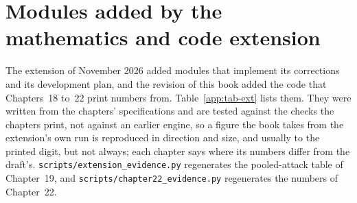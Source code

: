 \section{Modules added by the mathematics and code extension}

The extension of November 2026 added modules that implement its corrections and its development plan, and the
revision of this book added the code that Chapters~18 to~22 print numbers from. Table~\ref{app:tab-ext} lists them.
They were written from the chapters' specifications and are tested against the checks the chapters print, not against
an earlier engine, so a figure the book takes from the extension's own run is reproduced in direction and size, and
usually to the printed digit, but not always; each chapter says where its numbers differ from the draft's.
\texttt{scripts/\allowbreak{}extension\_\allowbreak{}evidence.\allowbreak{}py} regenerates the pooled-attack table of Chapter~19, and
\texttt{scripts/\allowbreak{}chapter22\_\allowbreak{}evidence.\allowbreak{}py} regenerates the numbers of Chapter~22.

